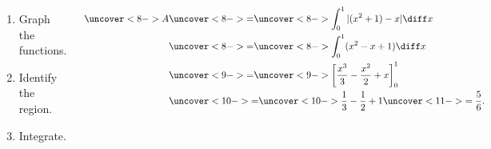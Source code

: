 \begin{frame}
\begin{example}
\begin{columns}
{}%
%  

\begin{enumerate}
\item<2->  Graph the functions.
\item<5->  Identify the region.
\item<7->  Integrate.
\end{enumerate}
\abovedisplayskip=0pt
\belowdisplayskip=0pt
\abovedisplayshortskip=0pt
\belowdisplayshortskip=0pt
\begin{align*}
\uncover<8->{A} & \uncover<8->{=}  \uncover<8->{\int_0^1 |(x^2 + 1) - x|\diff x} \\
 &  \uncover<8->{=}  \uncover<8->{\int_0^1 ( x^2 - x + 1 ) \diff x} \\
 & \uncover<9->{=}  \uncover<9->{\left[  \frac{x^3}{3} - \frac{x^2}{2} + x \right]_0^1} \\
 & \uncover<10->{=}  \uncover<10->{ \frac{1}{3} - \frac{1}{2} + 1 } \uncover<11->{  = \frac{5}{6}. } 
\end{align*}
\end{columns}
\end{example}
\end{frame}
